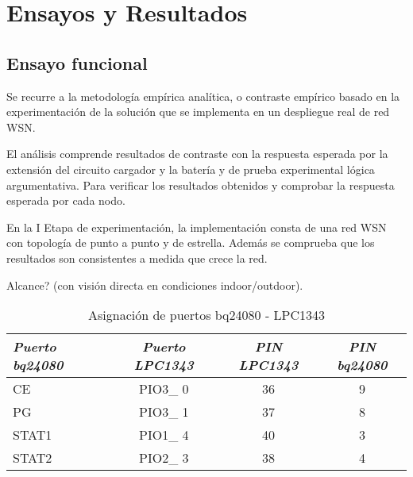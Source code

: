 
\chapter{Ensayos y Resultados} %
\label{Chapter4} 



\section{Ensayo funcional}
\label{sec:funcional}

Se recurre a la metodología empírica analítica, o contraste empírico basado en la experimentación de la solución que se implementa en un despliegue real de red WSN.

El análisis comprende resultados de contraste con la respuesta esperada por la extensión del circuito cargador y la batería y de prueba experimental lógica argumentativa. Para verificar los resultados obtenidos y comprobar la respuesta esperada por cada nodo.

En la I Etapa de experimentación, la implementación consta de una red WSN con topología de punto a punto y de estrella. Además se comprueba que los resultados son consistentes a medida que crece la red.

Alcance? (con visión directa en condiciones indoor/outdoor).


\begin{table}[ht]
	\centering
	\caption{Asignación de puertos bq24080 - LPC1343}
	\begin{tabular}{@{} l *3c @{}}    \toprule
		\emph{\textbf{Puerto bq24080}} & \emph{\textbf{Puerto LPC1343}} & \emph{\textbf{PIN LPC1343}} & \emph{\textbf{PIN bq24080}}\\
		\midrule
		CE &  PIO3\_ 0 & 36 & 9	\\	
		PG	&  PIO3\_ 1 & 37 & 8\\
		STAT1 &  PIO1\_ 4 & 40 & 3\\
		STAT2 &  PIO2\_ 3 & 38 & 4\\
		\bottomrule
		\hline
	\end{tabular}
	\label{tab:bq}
\end{table}

